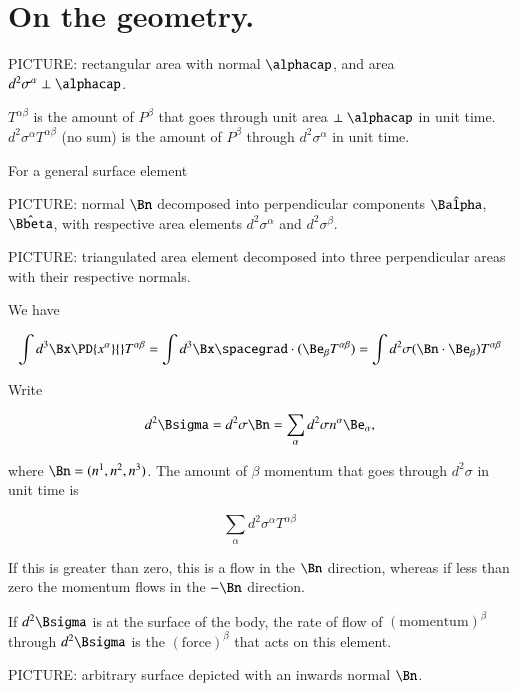\section{On the geometry.}

PICTURE: rectangular area with normal $\alphacap$, and area $d^2 \sigma^\alpha \perp \alphacap$.

$T^{\alpha\beta}$ is the amount of $P^\beta$ that goes through unit area $\perp \alphacap$ in unit time.  $d^2 \sigma^\alpha T^{\alpha \beta}$ (no sum) is the amount of $P^\beta$ through $d^2 \sigma^\alpha$ in unit time.

For a general surface element 

PICTURE: normal $\Bn$ decomposed into perpendicular components $\hat{\Balpha}$, $\hat{\Bbeta}$, with respective area elements $d^2 \sigma^\alpha$ and $d^2 \sigma^\beta$.  

PICTURE: triangulated area element decomposed into three perpendicular areas with their respective normals.

We have

\begin{equation}\label{eqn:relativisticElectrodynamicsL23:290}
\int d^3 \Bx \PD{x^\alpha}{} T^{\alpha\beta} = \int d^3 \Bx \spacegrad \cdot ( \Be_\beta T^{\alpha\beta} ) = \int d^2 \sigma (\Bn \cdot \Be_\beta) T^{\alpha \beta}
\end{equation}

Write

\begin{equation}\label{eqn:relativisticElectrodynamicsL23:310}
d^2 \Bsigma = d^2 \sigma \Bn = \sum_\alpha d^2 \sigma n^\alpha \Be_\alpha,
\end{equation}

where $\Bn = (n^1, n^2, n^3)$.  The amount of $\beta$ momentum that goes through $d^2 \sigma$ in unit time is 

\begin{equation}\label{eqn:relativisticElectrodynamicsL23:330}
\sum_\alpha d^2\sigma^\alpha T^{\alpha\beta} 
\end{equation}

If this is greater than zero, this is a flow in the $\Bn$ direction, whereas if less than zero the momentum flows in the $-\Bn$ direction.

If $d^2 \Bsigma$ is at the surface of the body, the rate of flow of $(\text{momentum})^\beta$ through $d^2 \Bsigma$ is the $(\text{force})^\beta$ that acts on this element.

PICTURE: arbitrary surface depicted with an inwards normal $\Bn$.

